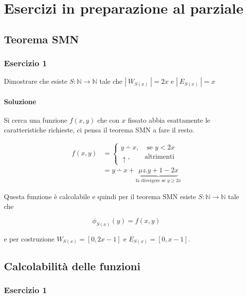 
\chapter{Esercizi in preparazione al parziale}


\section{Teorema SMN}

\subsection{Esercizio 1}

Dimostrare che esiste $ S : \mathbb{N} \rightarrow \mathbb{N}$ tale che $|\: W_{S(x)}\:|  = 2 x$ e $ |\: E_{S(x)}\:| =x $

\subsubsection{Soluzione}

Si cerca una funzione $ f(x,y) $ che con $ x $ fissato abbia esattamente le caratteristiche richieste, ci pensa il teorema SMN a fare il resto.

\begin{align*}
f(x,y) &= \begin{cases}
y \dotminus x, &\text{ se } y < 2x \\
\uparrow, &\text{altrimenti}
\end{cases} \\
 &= y\dotminus x + \underbrace{\mu z. y +1 -2x}_{\text{fa divergere se } y \geq 2x}
\end{align*}

Questa funzione è calcolabile e quindi per il teorema SMN esiste $ S : \mathbb{N} \rightarrow \mathbb{N} $ tale che 

$$
\phi_{S(x)}(y) = f(x,y)
$$

e per costruzione $W_{S(x)} = [0,2x-1]$ e $ E_{S(x)} = [0,x-1] $.

\section{Calcolabilità delle funzioni}

\subsection{Esercizio 1}

